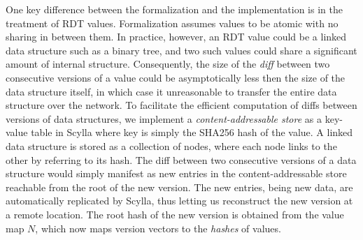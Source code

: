One key difference between the formalization and the implementation is
in the treatment of RDT values. Formalization assumes values to be
atomic with no sharing in between them. In practice, however, an RDT
value could be a linked data structure such as a binary tree, and two
such values could share a significant amount of internal structure.
Consequently, the size of the \emph{diff} between two consecutive
versions of a value could be asymptotically less then the size of the
data structure itself, in which case it unreasonable to transfer the
entire data structure over the network. To facilitate the efficient
computation of diffs between versions of data structures, we implement
a \emph{content-addressable store} as a key-value table in Scylla
where key is simply the SHA256 hash of the value. A linked data
structure is stored as a collection of nodes, where each node links to
the other by referring to its hash. The diff between two consecutive
versions of a data structure would simply manifest as new entries in
the content-addressable store reachable from the root of the new
version. The new entries, being new data, are automatically replicated
by Scylla, thus letting us reconstruct the new version at a remote
location. The root hash of the new version is obtained from the value
map $N$, which now maps version vectors to the \emph{hashes} of
values.
